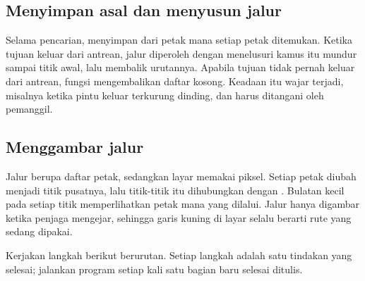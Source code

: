 \subsection*{Menyimpan asal dan menyusun jalur}

Selama pencarian,  menyimpan dari petak mana setiap petak
ditemukan. Ketika tujuan keluar dari antrean, jalur diperoleh dengan
menelusuri kamus itu mundur sampai titik awal, lalu membalik urutannya.
Apabila tujuan tidak pernah keluar dari antrean, fungsi mengembalikan daftar
kosong. Keadaan itu wajar terjadi, misalnya ketika pintu keluar terkurung
dinding, dan harus ditangani oleh pemanggil.

\subsection*{Menggambar jalur}

Jalur berupa daftar petak, sedangkan layar memakai piksel. Setiap petak
diubah menjadi titik pusatnya, lalu titik-titik itu dihubungkan dengan
. Bulatan kecil pada setiap titik memperlihatkan
petak mana yang dilalui. Jalur hanya digambar ketika penjaga mengejar,
sehingga garis kuning di layar selalu berarti rute yang sedang dipakai.


Kerjakan langkah berikut berurutan. Setiap langkah adalah satu tindakan yang
selesai; jalankan program setiap kali satu bagian baru selesai ditulis.

